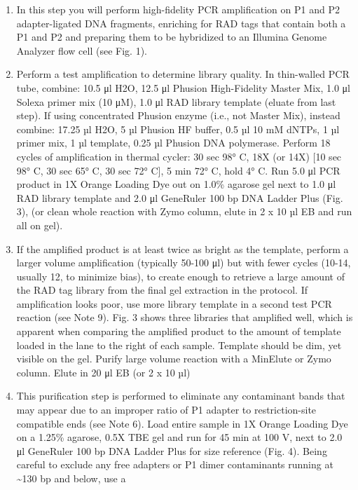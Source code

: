 \documentclass[
  letterpaper,
  DIV=11,
  numbers=noendperiod]{scrreprt}
\providecommand{\tightlist}{%
  \setlength{\itemsep}{0pt}\setlength{\parskip}{0pt}}\usepackage{longtable,booktabs,array}
\begin{document}
\begin{enumerate}
\def\labelenumi{\arabic{enumi}.}
\tightlist
\item
  In this step you will perform high-fidelity PCR amplification on P1
  and P2 adapter-ligated DNA fragments, enriching for RAD tags that
  contain both a P1 and P2 and preparing them to be hybridized to an
  Illumina Genome Analyzer flow cell (see Fig. 1).
\item
  Perform a test amplification to determine library quality. In
  thin-walled PCR tube, combine: 10.5 μl H2O, 12.5 μl Phusion
  High-Fidelity Master Mix, 1.0 μl Solexa primer mix (10 μM), 1.0 μl RAD
  library template (eluate from last step). If using concentrated
  Phusion enzyme (i.e., not Master Mix), instead combine: 17.25 µl H2O,
  5 µl Phusion HF buffer, 0.5 µl 10 mM dNTPs, 1 µl primer mix, 1 µl
  template, 0.25 µl Phusion DNA polymerase. Perform 18 cycles of
  amplification in thermal cycler: 30 sec 98° C, 18X (or 14X) {[}10 sec
  98° C, 30 sec 65° C, 30 sec 72° C{]}, 5 min 72° C, hold 4° C. Run 5.0
  μl PCR product in 1X Orange Loading Dye out on 1.0\% agarose gel next
  to 1.0 μl RAD library template and 2.0 μl GeneRuler 100 bp DNA Ladder
  Plus (Fig. 3), (or clean whole reaction with Zymo column, elute in 2 x
  10 µl EB and run all on gel).
\item
  If the amplified product is at least twice as bright as the template,
  perform a larger volume amplification (typically 50-100 μl) but with
  fewer cycles (10-14, usually 12, to minimize bias), to create enough
  to retrieve a large amount of the RAD tag library from the final gel
  extraction in the protocol. If amplification looks poor, use more
  library template in a second test PCR reaction (see Note 9). Fig. 3
  shows three libraries that amplified well, which is apparent when
  comparing the amplified product to the amount of template loaded in
  the lane to the right of each sample. Template should be dim, yet
  visible on the gel. Purify large volume reaction with a MinElute or
  Zymo column. Elute in 20 μl EB (or 2 x 10 µl)
\item
  This purification step is performed to eliminate any contaminant bands
  that may appear due to an improper ratio of P1 adapter to
  restriction-site compatible ends (see Note 6). Load entire sample in
  1X Orange Loading Dye on a 1.25\% agarose, 0.5X TBE gel and run for 45
  min at 100 V, next to 2.0 μl GeneRuler 100 bp DNA Ladder Plus for size
  reference (Fig. 4). Being careful to exclude any free adapters or P1
  dimer contaminants running at \textasciitilde130 bp and below, use a

\end{enumerate}
\end{document}
